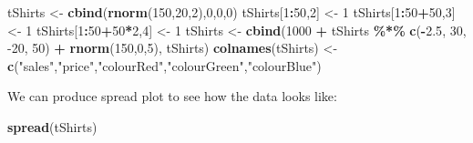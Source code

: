 \documentclass[
]{book}
\newenvironment{Shaded}{\begin{snugshade}}{\end{snugshade}}
\newcommand{\DecValTok}[1]{\textcolor[rgb]{0.00,0.00,0.81}{#1}}
\newcommand{\FloatTok}[1]{\textcolor[rgb]{0.00,0.00,0.81}{#1}}
\newcommand{\KeywordTok}[1]{\textcolor[rgb]{0.13,0.29,0.53}{\textbf{#1}}}
\newcommand{\NormalTok}[1]{#1}
\newcommand{\OperatorTok}[1]{\textcolor[rgb]{0.81,0.36,0.00}{\textbf{#1}}}
\newcommand{\StringTok}[1]{\textcolor[rgb]{0.31,0.60,0.02}{#1}}
\theoremstyle{definition}
\theoremstyle{definition}
\theoremstyle{definition}
\theoremstyle{definition}
\theoremstyle{remark}
\begin{document}
\begin{Shaded}
\begin{Highlighting}[]
\NormalTok{tShirts \textless{}{-}}\StringTok{ }\KeywordTok{cbind}\NormalTok{(}\KeywordTok{rnorm}\NormalTok{(}\DecValTok{150}\NormalTok{,}\DecValTok{20}\NormalTok{,}\DecValTok{2}\NormalTok{),}\DecValTok{0}\NormalTok{,}\DecValTok{0}\NormalTok{,}\DecValTok{0}\NormalTok{)}
\NormalTok{tShirts[}\DecValTok{1}\OperatorTok{:}\DecValTok{50}\NormalTok{,}\DecValTok{2}\NormalTok{] \textless{}{-}}\StringTok{ }\DecValTok{1}
\NormalTok{tShirts[}\DecValTok{1}\OperatorTok{:}\DecValTok{50}\OperatorTok{+}\DecValTok{50}\NormalTok{,}\DecValTok{3}\NormalTok{] \textless{}{-}}\StringTok{ }\DecValTok{1}
\NormalTok{tShirts[}\DecValTok{1}\OperatorTok{:}\DecValTok{50}\OperatorTok{+}\DecValTok{50}\OperatorTok{*}\DecValTok{2}\NormalTok{,}\DecValTok{4}\NormalTok{] \textless{}{-}}\StringTok{ }\DecValTok{1}
\NormalTok{tShirts \textless{}{-}}\StringTok{ }\KeywordTok{cbind}\NormalTok{(}\DecValTok{1000} \OperatorTok{+}\StringTok{ }\NormalTok{tShirts }\OperatorTok{\%*\%}\StringTok{ }\KeywordTok{c}\NormalTok{(}\OperatorTok{{-}}\FloatTok{2.5}\NormalTok{, }\DecValTok{30}\NormalTok{, }\DecValTok{{-}20}\NormalTok{, }\DecValTok{50}\NormalTok{) }\OperatorTok{+}\StringTok{ }\KeywordTok{rnorm}\NormalTok{(}\DecValTok{150}\NormalTok{,}\DecValTok{0}\NormalTok{,}\DecValTok{5}\NormalTok{), tShirts)}
\KeywordTok{colnames}\NormalTok{(tShirts) \textless{}{-}}\StringTok{ }\KeywordTok{c}\NormalTok{(}\StringTok{"sales"}\NormalTok{,}\StringTok{"price"}\NormalTok{,}\StringTok{"colourRed"}\NormalTok{,}\StringTok{"colourGreen"}\NormalTok{,}\StringTok{"colourBlue"}\NormalTok{)}
\end{Highlighting}
\end{Shaded}

We can produce spread plot to see how the data looks like:

\begin{Shaded}
\begin{Highlighting}[]
\KeywordTok{spread}\NormalTok{(tShirts)}
\end{Highlighting}
\end{Shaded}
\end{document}
